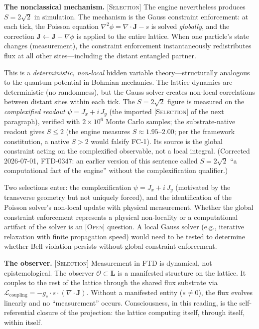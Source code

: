 \documentclass[12pt]{article}
\newcommand{\etag}[1]{{\normalfont\textsc{\footnotesize [#1]}}}
\theoremstyle{compact}
\begin{document}
\smallskip
\noindent\textbf{The nonclassical mechanism.} \etag{Selection} The engine nevertheless produces $S = 2\sqrt{2}$ in simulation. The mechanism is the Gauss constraint enforcement: at each tick, the Poisson equation $\nabla^2\phi = \nabla \cdot \mathbf{J} - s$ is solved \emph{globally}, and the correction $\mathbf{J} \leftarrow \mathbf{J} - \nabla\phi$ is applied to the entire lattice. When one particle's state changes (measurement), the constraint enforcement instantaneously redistributes flux at all other sites---including the distant entangled partner.

This is a \emph{deterministic, non-local} hidden variable theory---structurally analogous to the quantum potential in Bohmian mechanics. The lattice dynamics are deterministic (no randomness), but the Gauss solver creates non-local correlations between distant sites within each tick. The $S = 2\sqrt{2}$ figure is measured on the \emph{complexified readout} $\psi = J_x + i\,J_y$ (the imported \etag{Selection} of the next paragraph), verified with $2 \times 10^6$ Monte Carlo samples; the substrate-native readout gives $S \le 2$ (the engine measures $S \approx 1.95$--$2.00$; per the framework constitution, a native $S > 2$ would falsify FC-1). Its source is the global constraint acting on the complexified observable, not a local integral. (Corrected 2026-07-01, FTD-0347: an earlier version of this sentence called $S = 2\sqrt{2}$ ``a computational fact of the engine'' without the complexification qualifier.)

Two selections enter: the complexification $\psi = J_x + i\,J_y$ (motivated by the transverse geometry but not uniquely forced), and the identification of the Poisson solver's non-local update with physical measurement. Whether the global constraint enforcement represents a physical non-locality or a computational artifact of the solver is an \etag{Open} question. A local Gauss solver (e.g., iterative relaxation with finite propagation speed) would need to be tested to determine whether Bell violation persists without global constraint enforcement.

\smallskip

\noindent\textbf{The observer.} \etag{Selection} Measurement in FTD is dynamical, not epistemological. The observer $\mathcal{O} \subset \mathbf{L}$ is a manifested structure on the lattice. It couples to the rest of the lattice through the shared flux substrate via $\mathcal{L}_{\mathrm{coupling}} = -g_c \cdot s \cdot (\nabla \cdot \mathbf{J})$. Without a manifested entity ($s \neq 0$), the flux evolves linearly and no ``measurement'' occurs. Consciousness, in this reading, is the self-referential closure of the projection: the lattice computing itself, through itself, within itself.
\end{document}
